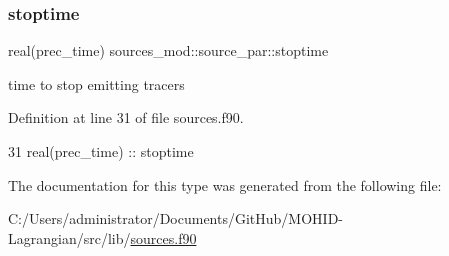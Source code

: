 \subsubsection{\texorpdfstring{stoptime}{stoptime}}
{\footnotesize\ttfamily real(prec\+\_\+time) sources\+\_\+mod\+::source\+\_\+par\+::stoptime\hspace{0.3cm}{\ttfamily [private]}}



time to stop emitting tracers 



Definition at line 31 of file sources.\+f90.


\begin{DoxyCode}
31         \textcolor{keywordtype}{real(prec\_time)} :: stoptime
\end{DoxyCode}


The documentation for this type was generated from the following file\+:\begin{DoxyCompactItemize}
\item 
C\+:/\+Users/administrator/\+Documents/\+Git\+Hub/\+M\+O\+H\+I\+D-\/\+Lagrangian/src/lib/\mbox{\hyperlink{sources_8f90}{sources.\+f90}}\end{DoxyCompactItemize}
